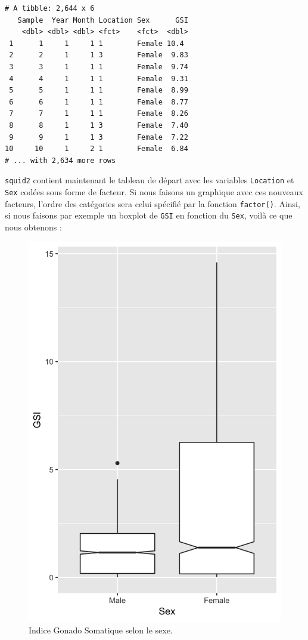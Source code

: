 \documentclass[a4paperpaper,]{article}
\newenvironment{Shaded}{\begin{snugshade}}{\end{snugshade}}
\newcommand{\KeywordTok}[1]{\textcolor[rgb]{0.13,0.29,0.53}{\textbf{#1}}}
\newcommand{\DataTypeTok}[1]{\textcolor[rgb]{0.13,0.29,0.53}{#1}}
\newcommand{\StringTok}[1]{\textcolor[rgb]{0.31,0.60,0.02}{#1}}
\newcommand{\OtherTok}[1]{\textcolor[rgb]{0.56,0.35,0.01}{#1}}
\newcommand{\OperatorTok}[1]{\textcolor[rgb]{0.81,0.36,0.00}{\textbf{#1}}}
\newcommand{\NormalTok}[1]{#1}
\theoremstyle{definition}
\theoremstyle{definition}
\theoremstyle{definition}
\theoremstyle{remark}
\begin{document}
\begin{verbatim}
# A tibble: 2,644 x 6
   Sample  Year Month Location Sex      GSI
    <dbl> <dbl> <dbl> <fct>    <fct>  <dbl>
 1      1     1     1 1        Female 10.4 
 2      2     1     1 3        Female  9.83
 3      3     1     1 1        Female  9.74
 4      4     1     1 1        Female  9.31
 5      5     1     1 1        Female  8.99
 6      6     1     1 1        Female  8.77
 7      7     1     1 1        Female  8.26
 8      8     1     1 3        Female  7.40
 9      9     1     1 3        Female  7.22
10     10     1     2 1        Female  6.84
# ... with 2,634 more rows
\end{verbatim}

\texttt{squid2} contient maintenant le tableau de départ avec les
variables \texttt{Location} et \texttt{Sex} codées sous forme de
facteur. Si nous faisons un graphique avec ces nouveaux facteurs,
l'ordre des catégories sera celui spécifié par la fonction
\texttt{factor()}. Ainsi, si nous faisons par exemple un boxplot de
\texttt{GSI} en fonction du \texttt{Sex}, voilà ce que nous obtenons :

\begin{Shaded}
\end{Shaded}

\begin{figure}[htpb]

{\centering \includegraphics[width=0.5\linewidth]{figure/unnamed-chunk-137-1} 

}

\caption{Indice Gonado Somatique  selon le sexe.}\label{fig:unnamed-chunk-137}
\end{figure}
\end{document}
